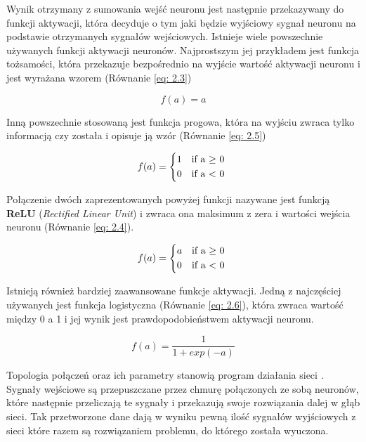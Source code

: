 \documentclass[12pt, oneside, a4paper]{report}
\begin{document}
Wynik otrzymany z sumowania wejść neuronu jest następnie przekazywany do funkcji aktywacji, która decyduje o tym jaki będzie wyjściowy sygnał neuronu na podstawie otrzymanych sygnałów wejściowych. Istnieje wiele powszechnie używanych funkcji aktywacji neuronów. Najprostszym jej przykładem jest funkcja tożsamości, która przekazuje bezpośrednio na wyjście wartość aktywacji neuronu i jest wyrażana wzorem (Równanie \ref{eq: 2.3})

\begin{equation}\label{eq: 2.3}
  f(a) = a
\end{equation}

Inną powszechnie stosowaną jest funkcja progowa, która na wyjściu zwraca tylko informacją czy została i opisuje ją wzór (Równanie \ref{eq: 2.5})

\begin{equation}\label{eq: 2.5}
  f(a) =
  \begin{cases*}
    1 & if a $\geq$ 0 \\
    0 & if a < 0
  \end{cases*}
\end{equation}

Połączenie dwóch zaprezentowanych powyżej funkcji nazywane jest funkcją \textbf{ReLU} (\textit{Rectified Linear Unit}) i zwraca ona maksimum z zera i wartości wejścia neuronu (Równanie \ref{eq: 2.4}).

\begin{equation}\label{eq: 2.4}
    f(a) =
    \begin{cases*}
      a & if a $\geq$ 0 \\
      0 & if a < 0
    \end{cases*}
\end{equation}

Istnieją również bardziej zaawansowane funkcje aktywacji. Jedną z najczęściej używanych jest funkcja logistyczna (Równanie \ref{eq: 2.6}), która zwraca wartość między 0 a 1 i jej wynik jest prawdopodobieństwem aktywacji neuronu.

\begin{equation}\label{eq: 2.6}
  f(a) = \frac{1}{1 + exp(-a)}
\end{equation}

Topologia połączeń oraz ich parametry stanowią program działania sieci \citep{tadeusiewicz1993sieci}. Sygnały wejściowe są przepuszczane przez chmurę połączonych ze sobą neuronów, które następnie przeliczają te sygnały i przekazują swoje rozwiązania dalej w głąb sieci. Tak przetworzone dane dają w wyniku pewną ilość sygnałów wyjściowych z sieci które razem są rozwiązaniem problemu, do którego została wyuczona.
\end{document}
